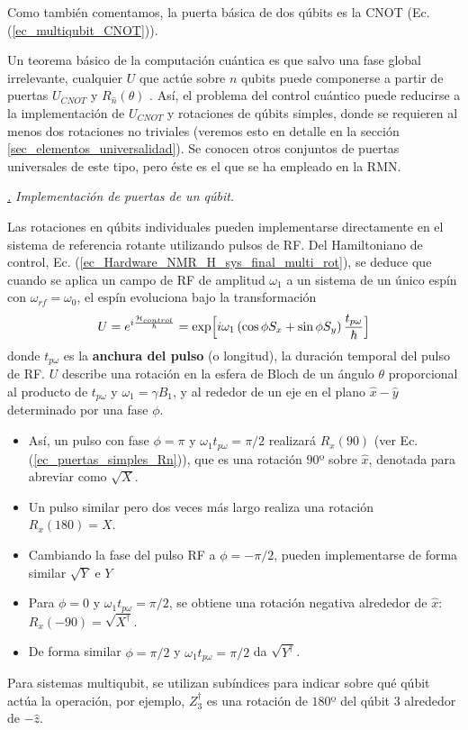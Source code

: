 \documentclass[a4paper,11pt]{book} %
\numberwithin{equation}{chapter}
\def\lp{\left(}
\def\rp{\right)}
\def\Lc{\Bigl[}
\def\Rc{\Bigr]}
\def\subsubiContadorIt{\par\addtocounter{subsubsection}{1}\underline{\it\thesubsubsection.}\hskip0.5cm \setcounter{subsubsubsectionIt}{0}}
\newcommand{\SubsubiIt}[1]{
		\subsubiContadorIt \textit{#1}
	}
\newcounter{subsubsubsectionIt}[subsubsection]
\begin{document}
Como también comentamos, la puerta básica de dos qúbits es la CNOT (Ec. (\ref{ec_multiqubit_CNOT})). 

Un teorema básico de la computación cuántica es que salvo una fase global irrelevante, cualquier $U$ que actúe sobre $n$ qubits puede componerse a partir de puertas $U_{CNOT}$ y $R_{\hat{n}}(\theta)$ \cite{nielsen_chuang_2010} . Así, el problema del control cuántico puede reducirse a la implementación de $U_{CNOT}$ y rotaciones de qúbits simples, donde se requieren al menos dos rotaciones no triviales (veremos esto en detalle en la sección \ref{sec_elementos_universalidad}). Se conocen otros conjuntos de puertas universales de este tipo, pero éste es el que se ha empleado en la RMN.


			\SubsubiIt{Implementación de puertas de un qúbit.}

Las rotaciones en qúbits individuales pueden implementarse directamente en el sistema de referencia rotante utilizando pulsos de RF. Del Hamiltoniano de control, Ec. (\ref{ec_Hardware_NMR_H_sys_final_multi_rot}), se deduce que cuando se aplica un campo de RF de amplitud $\omega_1$ a un sistema de un único espín con $\omega_{rf} = \omega_0$, el espín evoluciona bajo la transformación
	\begin{equation} \label{ec_Hardware_NMR_U_arbitrario}
	U = e^{i \frac{\mathcal{H}_{control}}{\hbar}} = \exp \Lc i \omega_1 \lp  \cos \phi S_x + \sin \phi S_y \rp \frac{t_{p \omega}}{\hbar} \Rc
	\end{equation}
donde $t_{p \omega}$ es la \textbf{anchura del pulso} (o longitud), la duración temporal del pulso de RF. $U$ describe una rotación en la esfera de Bloch de un ángulo $\theta$ proporcional al producto de $t_{p\omega}$ y $\omega_1 = \gamma B_1$, y al rededor de un eje en el plano $\hat{x}-\hat{y}$ determinado por una fase $\phi$.

\begin{itemize}
	\item Así, un pulso con fase $\phi = \pi$ y $\omega_1 t_{p\omega} = \pi/2$ realizará $R_x(90)$ (ver Ec. (\ref{ec_puertas_simples_Rn})), que es una rotación $90$º sobre $\hat{x}$, denotada para abreviar como $\sqrt{X}$.
	\item Un pulso similar pero dos veces más largo realiza una rotación $R_x(180) =  X$.
	\item Cambiando la fase del pulso RF a $\phi = -\pi/2$, pueden implementarse de forma similar $\sqrt{Y}$ e $Y$
	\item Para $\phi = 0$ y $\omega_1 t_{p\omega} = \pi/2$, se obtiene una rotación negativa alrededor de $\hat{x}$: $R_x (-90) = \sqrt{X^\dagger}$.
	\item De forma similar $\phi = \pi/2$ y $\omega_1 t_{p\omega} = \pi/2$ da $\sqrt{Y^\dagger}$.
\end{itemize}
Para sistemas multiqubit, se utilizan subíndices para indicar sobre qué qúbit actúa la operación, por ejemplo, $Z^\dagger_3$ es una rotación de $180$º del qúbit 3 alrededor de $- \hat{z}$.
\end{document}
